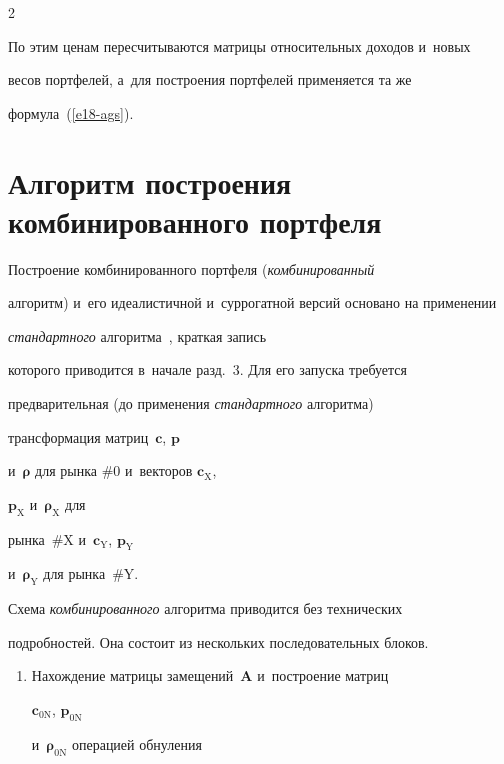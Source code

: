 \begin{multicols}{2}


  По этим ценам пересчитываются матрицы относительных доходов и~новых 


весов портфелей, а~для построения портфелей применяется та же 


формула~(\ref{e18-ags}). 


  


  \section{Алгоритм построения комбинированного портфеля}


   


  Построение комбинированного портфеля (\textit{комбинированный} 


алгоритм) и~его идеалистичной и~суррогатной версий основано на применении 


\textit{стандартного} алгоритма~\cite{2-ags, 3-ags, 4-ags, 5-ags}, краткая запись 


которого приводится в~начале разд.~3. Для его запуска требуется 


предварительная (до применения \textit{стандартного} алгоритма) 


трансформация мат\-риц~$\boldsymbol{c}$, $\boldsymbol{p}$ 


и~$\boldsymbol{\rho}$ для рынка \#0 и~векторов $\boldsymbol{c}_{\mathrm{X}}$, 


$\boldsymbol{p}_{\mathrm{X}}$ и~$\boldsymbol{\rho}_{\mathrm{X}}$ для 


рынка~\#X и~$\boldsymbol{c}_{\mathrm{Y}}$, $\boldsymbol{p}_{\mathrm{Y}}$ 


и~$\boldsymbol{\rho}_{\mathrm{Y}}$ для рынка~\#Y. 


  


  Схема \textit{комбинированного} алгоритма приводится без технических 


подробностей. Она состоит из нескольких последовательных блоков. 


  \begin{enumerate}[1.]


  \item  Нахождение матрицы замещений~$\mathbf{A}$ и~по\-стро\-ение матриц 


$\boldsymbol{c}_{0\mathrm{N}}$, $\boldsymbol{p}_{0\mathrm{N}}$ 


и~$\boldsymbol{\rho}_{0\mathrm{N}}$ операцией обнуления  



\end{enumerate}
\end{multicols}
